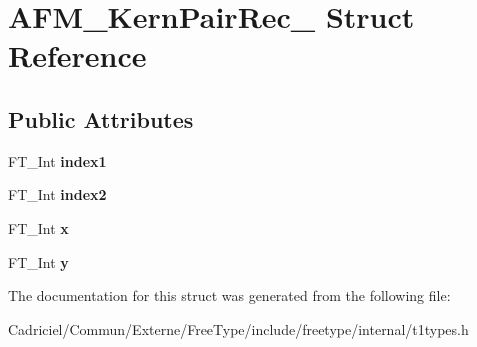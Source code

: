 \hypertarget{struct_a_f_m___kern_pair_rec__}{}\section{A\+F\+M\+\_\+\+Kern\+Pair\+Rec\+\_\+ Struct Reference}
\label{struct_a_f_m___kern_pair_rec__}
\subsection*{Public Attributes}
\begin{DoxyCompactItemize}
\item 
F\+T\+\_\+\+Int {\bfseries index1}\hypertarget{struct_a_f_m___kern_pair_rec___a732bca56dd4a070b1d887ada1637e810}{}\label{struct_a_f_m___kern_pair_rec___a732bca56dd4a070b1d887ada1637e810}

\item 
F\+T\+\_\+\+Int {\bfseries index2}\hypertarget{struct_a_f_m___kern_pair_rec___aee548123779323c255180112c7f5b831}{}\label{struct_a_f_m___kern_pair_rec___aee548123779323c255180112c7f5b831}

\item 
F\+T\+\_\+\+Int {\bfseries x}\hypertarget{struct_a_f_m___kern_pair_rec___a4b7f90a0e17ed89353fec14ddb29fa12}{}\label{struct_a_f_m___kern_pair_rec___a4b7f90a0e17ed89353fec14ddb29fa12}

\item 
F\+T\+\_\+\+Int {\bfseries y}\hypertarget{struct_a_f_m___kern_pair_rec___aa177aa612e79701261eba72c76ea3f08}{}\label{struct_a_f_m___kern_pair_rec___aa177aa612e79701261eba72c76ea3f08}

\end{DoxyCompactItemize}


The documentation for this struct was generated from the following file\+:\begin{DoxyCompactItemize}
\item 
Cadriciel/\+Commun/\+Externe/\+Free\+Type/include/freetype/internal/t1types.\+h\end{DoxyCompactItemize}
